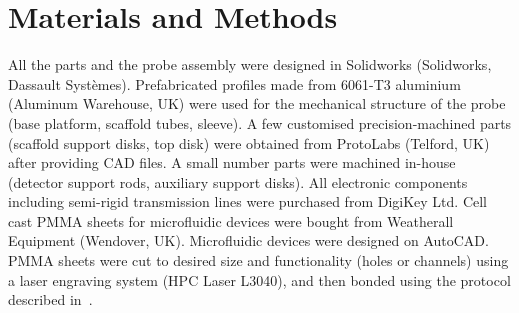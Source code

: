 \documentclass[preprint,12pt]{article}
\begin{document}
\section{Materials and Methods}
All the parts and the probe assembly were designed in Solidworks (Solidworks, Dassault Syst\`{e}mes). 
Prefabricated profiles made from 6061-T3 aluminium (Aluminum Warehouse, UK) were used for the
 mechanical structure of the probe
(base platform, scaffold tubes, sleeve). 
A few customised precision-machined parts (scaffold support disks, top disk) were obtained from 
ProtoLabs (Telford, UK) after providing CAD files. A small number parts were machined in-house
 (detector support rods, auxiliary support disks). 
 All  electronic components including semi-rigid transmission lines were purchased from DigiKey Ltd. 
 Cell cast PMMA sheets for microfluidic devices were bought from Weatherall Equipment (Wendover, UK). Microfluidic 
devices were designed on AutoCAD. PMMA sheets were cut to desired size and functionality (holes or channels) using a 
laser engraving system  (HPC Laser L3040), 
and then bonded using the protocol described in~\cite{yilmaz_bonding}.
\end{document}
